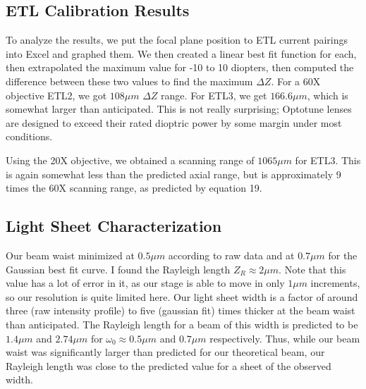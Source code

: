 \subsection{ETL Calibration Results}
\par To analyze the results, we put the focal plane position to ETL current pairings into Excel and graphed them. We then created a linear best fit function for each, then extrapolated the maximum value for -10 to 10 diopters, then computed the difference between these two values to find the maximum $\Delta Z$. For a 60X objective ETL2, we got $108\mu m$ $\Delta Z$ range. For ETL3, we get $166.6 \mu m$, which is somewhat larger than anticipated. This is not really surprising; Optotune lenses are designed to exceed their rated dioptric power by some margin under most conditions.
\par Using the 20X objective, %
 we obtained a scanning range of $1065\mu m$ for ETL3. This is again somewhat less than the predicted axial range, but is approximately 9 times the 60X scanning range, as predicted by equation 19.
\subsection{Light Sheet Characterization} %
Our beam waist minimized at $0.5 \mu m$ according to raw data and at $0.7\mu m$ for the Gaussian best fit curve. I found the Rayleigh length $Z_R\approx 2 \mu m$. Note that this value has a lot of error in it, as our stage is able to move in only $1\mu m$ increments, so our resolution is quite limited here. Our light sheet width is a factor of around three (raw intensity profile) to five (gaussian fit) times thicker at the beam waist than anticipated. The Rayleigh length for a beam of this width is predicted to be $1.4 \mu m$ and $2.74 \mu m$ for $\omega_0 \approx 0.5 \mu m$ and $0.7 \mu m$ respectively. Thus, while our beam waist was significantly larger than predicted for our theoretical beam, our Rayleigh length was close to the predicted value for a sheet of the observed width.
